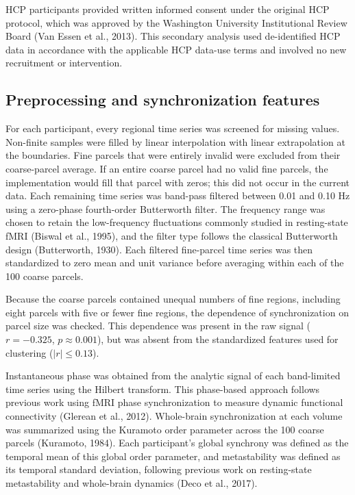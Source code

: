 \documentclass[12pt,a4paper]{report}
\begin{document}
HCP participants provided written informed consent under the original HCP protocol, which was approved by the Washington University Institutional Review Board (Van Essen et al., 2013). This secondary analysis used de-identified HCP data in accordance with the applicable HCP data-use terms and involved no new recruitment or intervention.

\subsection{Preprocessing and synchronization features}

For each participant, every regional time series was screened for missing values. Non-finite samples were filled by linear interpolation with linear extrapolation at the boundaries. Fine parcels that were entirely invalid were excluded from their coarse-parcel average. If an entire coarse parcel had no valid fine parcels, the implementation would fill that parcel with zeros; this did not occur in the current data. Each remaining time series was band-pass filtered between 0.01 and 0.10 Hz using a zero-phase fourth-order Butterworth filter. The frequency range was chosen to retain the low-frequency fluctuations commonly studied in resting-state fMRI (Biswal et al., 1995), and the filter type follows the classical Butterworth design (Butterworth, 1930). Each filtered fine-parcel time series was then standardized to zero mean and unit variance before averaging within each of the 100 coarse parcels.

Because the coarse parcels contained unequal numbers of fine regions, including eight parcels with five or fewer fine regions, the dependence of synchronization on parcel size was checked. This dependence was present in the raw signal ($r = -0.325$, $p \approx 0.001$), but was absent from the standardized features used for clustering ($|r| \leq 0.13$).

Instantaneous phase was obtained from the analytic signal of each band-limited time series using the Hilbert transform. This phase-based approach follows previous work using fMRI phase synchronization to measure dynamic functional connectivity (Glerean et al., 2012). Whole-brain synchronization at each volume was summarized using the Kuramoto order parameter across the 100 coarse parcels (Kuramoto, 1984). Each participant's global synchrony was defined as the temporal mean of this global order parameter, and metastability was defined as its temporal standard deviation, following previous work on resting-state metastability and whole-brain dynamics (Deco et al., 2017).
\end{document}
